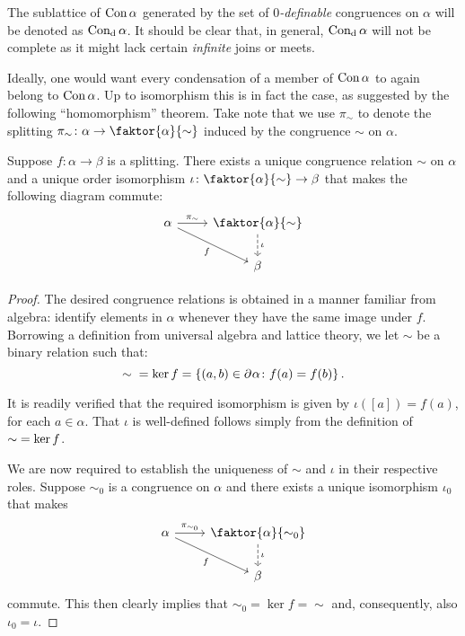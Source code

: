 The sublattice of $\con\alpha$ generated by the set of $0$\textit{-definable}
congruences on $\alpha$ will be denoted as $\defcon{\alpha}$.  It should be clear
that, in general, $\defcon{\alpha}$ will not be complete as it might lack
certain \textit{infinite} joins or meets.

Ideally, one would want every condensation of a member of $\con\alpha$ to again
belong to $\con\alpha$.  Up to isomorphism this is in fact the case, as
suggested by the following ``homomorphism'' theorem.  Take note that we use
$\pi_\sim$ to denote the splitting
$\pi_\sim\colon\alpha\to\faktor{\alpha}{\sim}$ induced by the congruence $\sim$
on $\alpha$.

\begin{prp}[Homomorphisms]
	 Suppose $f\colon\alpha\to\beta$ is a splitting. There exists a unique
	 congruence relation $\sim$ on $\alpha$ and a unique order isomorphism
	 $\iota\colon\faktor{\alpha}{\sim}\to\beta$ that makes the following diagram
	 commute:
	\begin{equation}
		\begin{tikzcd}
			\alpha \arrow[r, "\pi_\sim",rightarrow]&   \faktor{\alpha}{\sim}\\
			 &   \beta\arrow[from=u,"\iota", dashrightarrow]
			 \arrow[from=ul,"f"']
		\end{tikzcd}
	\end{equation}
\end{prp}
\begin{proof}
	The desired congruence relations is obtained in a manner familiar from
	algebra:  identify elements in $\alpha$ whenever they have the same image
	under $f$.  Borrowing a definition from universal algebra and lattice
	theory, we let $\sim$ be a binary relation such that:
	\begin{equation}
		\sim{}=\kernel f=\setbuild{(a,b)\in\domain{2}\alpha}{f(a)=f(b)}.
	\end{equation}

	It is readily verified that the required isomorphism is given by
	$\iota([a])=f(a)$, for each $a\in\alpha$.  That $\iota$ is well-defined
	follows simply from the definition of ${\sim}=\kernel f$.

	We are now required to establish the uniqueness of $\sim$ and $\iota$ in
	their respective roles.  Suppose $\sim_0$ is a congruence on $\alpha$ and
	there exists a unique isomorphism $\iota_0$ that makes
	\begin{equation}
		\begin{tikzcd}
			\alpha\arrow[r, "\pi_{\sim_0}",rightarrow]&
			\faktor{\alpha}{\sim_0}\\
			 &   \beta\arrow[from=u,"\iota", dashrightarrow]
			 \arrow[from=ul,"f"']
		\end{tikzcd}
	\end{equation}
	commute.  This then clearly implies that ${\sim_0}=\ker f={\sim}$ and,
	consequently, also $\iota_0=\iota$.
\end{proof}


